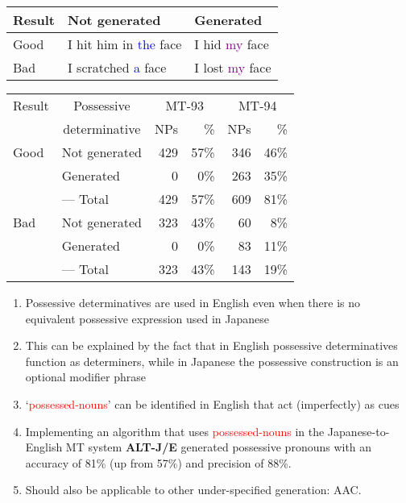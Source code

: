 \documentclass[a4paper,landscape,headrule,footrule,xetex]{foils}
\newcommand{\psp}[1]{\textcolor{purple}{#1}}
\newcommand{\dtr}[1]{\textcolor{blue}{#1}}
\newcommand{\trg}[1]{\textcolor{red}{#1}}
\begin{document}
  \begin{center}
    \begin{tabular}{|l|l|l|} \hline
      Result & Not generated & Generated  \\ \hline
      Good &I hit him in \dtr{the} face  &  I hid \psp{my} face \\ \hline
      Bad &  I scratched \dtr{a} face       & I lost \psp{my} face \\ \hline
    \end{tabular}

    \begin{tabular}{|l|l|rr|rr|} \hline
      Result & \multicolumn{1}{c|}{Possessive}  &
      \multicolumn{2}{c|}{MT-93} & \multicolumn{2}{c|}{MT-94}\\ 
      & \multicolumn{1}{c|}{determinative}     & NPs & \%& NPs & \% \\ \hline
      Good & Not generated & 429 & 57\% & 346  & 46\%\\
      & Generated     &   0 & 0\%  & 263  & 35\%\\ \cline{2-6}
      & --- Total & 429 &  57\% & 609 & 81\%  \\ \hline
      Bad  & Not generated & 323 & 43\% &  60 & 8\% \\
      & Generated     &   0 & 0\%  &  83 & 11\% \\ \cline{2-6}
      & --- Total     &  323 & 43\% & 143 & 19\%  \\  \hline 
    \end{tabular}
  \end{center}



  \begin{enumerate}
  \item Possessive determinatives are used in English even when there
    is no equivalent possessive expression used in Japanese
  \item This can be explained by the fact that in English possessive
    determinatives function as determiners, while in Japanese the
    possessive construction is an optional modifier phrase
  \item `\trg{possessed-nouns}' can be identified in English that act
    (imperfectly) as cues
  \item Implementing an algorithm  that uses
    \trg{possessed-nouns} in the Japanese-to-English MT system {\bf
      ALT-J/E} generated possessive pronouns with an accuracy of
    81\% (up from 57\%) and precision of 88\%.
  \item Should also be applicable to other under-specified generation: AAC.
  \end{enumerate}
\end{document}

